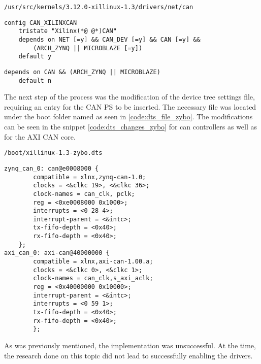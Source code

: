 \begin{lstlisting}[caption={CAN Kconfig pathfile.},numbers=none,label=code:can_kconfig_pathfile]
/usr/src/kernels/3.12.0-xillinux-1.3/drivers/net/can
\end{lstlisting}

\begin{lstlisting}[firstnumber=128,caption={Kconfig file contents from line 128.},label={code:can_kconfig_contents_line128}]
config CAN_XILINXCAN
	tristate "Xilinx(*@ @*)CAN"
	depends on NET [=y] && CAN_DEV [=y] && CAN [=y] && 
        (ARCH_ZYNQ || MICROBLAZE [=y])
	default y
\end{lstlisting}

\begin{lstlisting}[firstnumber=130,caption={Original content of lines 130 and 131.},label={code:can_kconfig_original_line130}]
	depends on CAN && (ARCH_ZYNQ || MICROBLAZE)
	default n
\end{lstlisting}

The next step of the process was the modification of the device tree settings file, requiring an entry for the CAN PS to be inserted.
The necessary file was located under the boot folder named as seen in \ref{code:dts_file_zybo}.
The modifications can be seen in the snippet \ref{code:dts_changes_zybo} for can controllers as well as for the AXI CAN core.

\begin{lstlisting}[numbers=none,caption={Device tree settings file and its path.},label={code:dts_file_zybo}]
/boot/xillinux-1.3-zybo.dts
\end{lstlisting}
\begin{lstlisting}[caption={Device tree settings changes.},label={code:dts_changes_zybo}]
zynq_can_0: can@e0008000 {
        compatible = xlnx,zynq-can-1.0;
        clocks = <&clkc 19>, <&clkc 36>;
        clock-names = can_clk, pclk;
        reg = <0xe0008000 0x1000>;
        interrupts = <0 28 4>;
        interrupt-parent = <&intc>;
        tx-fifo-depth = <0x40>;
        rx-fifo-depth = <0x40>;
    };
axi_can_0: axi-can@40000000 {
        compatible = xlnx,axi-can-1.00.a;
        clocks = <&clkc 0>, <&clkc 1>;
        clock-names = can_clk,s_axi_aclk;
        reg = <0x40000000 0x10000>;
        interrupt-parent = <&intc>;
        interrupts = <0 59 1>;
        tx-fifo-depth = <0x40>;
        rx-fifo-depth = <0x40>;
        };
\end{lstlisting}

As was previously mentioned, the implementation was unsuccessful. At the time, the research done on this topic did not lead to successfully enabling the drivers.


